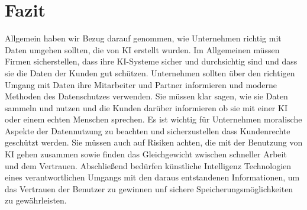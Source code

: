 \documentclass{report}
\begin{document}
\chapter{Fazit}

Allgemein haben wir Bezug darauf genommen, wie Unternehmen richtig mit Daten umgehen sollten, die von KI erstellt wurden. Im Allgemeinen müssen Firmen sicherstellen, dass ihre KI-Systeme sicher und durchsichtig sind und dass sie die Daten der Kunden gut schützen.
\newline
\newline
Unternehmen sollten über den richtigen Umgang mit Daten ihre Mitarbeiter und Partner informieren und moderne Methoden des Datenschutzes verwenden. Sie müssen klar sagen, wie sie Daten sammeln und nutzen und die Kunden darüber informieren ob sie mit einer KI oder einem echten Menschen sprechen.
\newline
Es ist wichtig für Unternehmen moralische Aspekte der Datennutzung zu beachten und sicherzustellen dass Kundenrechte geschützt werden. Sie müssen auch auf Risiken achten, die mit der Benutzung von KI gehen zusammen sowie finden das Gleichgewicht zwischen schneller Arbeit und dem Vertrauen.
\newline
\newline
Abschließend bedürfen künstliche Intelligenz Technologien eines verantwortlichen Umgangs mit den daraus entstandenen Informationen, um das Vertrauen der Benutzer zu gewinnen unf sichere Speicherungsmöglichkeiten zu gewährleisten.

\printbibliography
\end{document}
